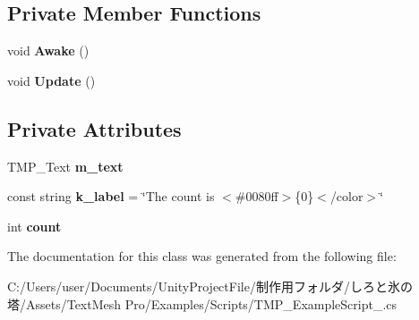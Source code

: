 \subsection*{Private Member Functions}
\begin{DoxyCompactItemize}
\item 
\mbox{\label{class_t_m_pro_1_1_examples_1_1_t_m_p___example_script__01_a192c22093a9eef79c995f068bb1199dc}} 
void {\bfseries Awake} ()
\item 
\mbox{\label{class_t_m_pro_1_1_examples_1_1_t_m_p___example_script__01_a8595951a77c04c9de253f369f57b9833}} 
void {\bfseries Update} ()
\end{DoxyCompactItemize}
\subsection*{Private Attributes}
\begin{DoxyCompactItemize}
\item 
\mbox{\label{class_t_m_pro_1_1_examples_1_1_t_m_p___example_script__01_aa01a999011188765bec2692ae268688b}} 
T\+M\+P\+\_\+\+Text {\bfseries m\+\_\+text}
\item 
\mbox{\label{class_t_m_pro_1_1_examples_1_1_t_m_p___example_script__01_a544b2c8a9c3f5cea86adc87fb23023b8}} 
const string {\bfseries k\+\_\+label} = \char`\"{}The count is $<$\#0080ff$>$\{0\}$<$/color$>$\char`\"{}
\item 
\mbox{\label{class_t_m_pro_1_1_examples_1_1_t_m_p___example_script__01_a1143f9bc8f88dd6da716bc495578b1e3}} 
int {\bfseries count}
\end{DoxyCompactItemize}


The documentation for this class was generated from the following file\+:\begin{DoxyCompactItemize}
\item 
C\+:/\+Users/user/\+Documents/\+Unity\+Project\+File/制作用フォルダ/しろと氷の塔/\+Assets/\+Text\+Mesh Pro/\+Examples/\+Scripts/T\+M\+P\+\_\+\+Example\+Script\+\_.\+cs\end{DoxyCompactItemize}
